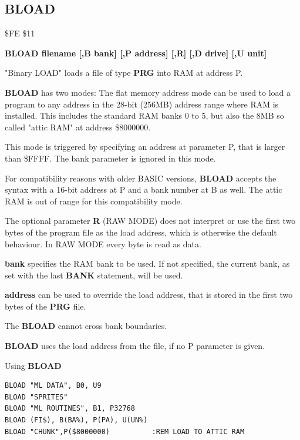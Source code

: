 \subsection{BLOAD}
\begin{description}[leftmargin=2cm,style=nextline]
\item [Token:] \$FE \$11
\item [Format:] {\bf BLOAD filename [,B bank] [,P address] [,R] [,D drive] [,U unit] }
\item [Usage:]
   "Binary LOAD" loads a file of type {\bf PRG} into RAM at address P.

   {\bf BLOAD} has two modes:
   The flat memory address mode can be used to load a program to any
   address in the 28-bit (256MB) address range where RAM is installed.
   This includes the standard RAM banks 0 to 5, but also
   the 8MB so called "attic RAM" at address \$8000000.

   This mode is triggered by specifying an address at parameter P,
   that is larger than \$FFFF. The bank parameter is ignored in this mode.

   For compatibility reasons with older BASIC versions, {\bf BLOAD}
   accepts the syntax with a 16-bit address at P and a bank number at B as well.
   The attic RAM is out of range for this compatibility mode.

   The optional parameter {\bf R} (RAW MODE) does not interpret or use the
   first two bytes of the program file as the load address, which is otherwise the
   default behaviour. In RAW MODE every byte is read as data.

   \filenamedefinition

   {\bf bank} specifies the RAM bank to be used.
   If not specified, the current bank, as set with the last
   {\bf BANK} statement, will be used.

   {\bf address} can be used to override the load address,
   that is stored in the first two bytes of the {\bf PRG} file.

   \drivedefinition

   \unitdefinition

\item [Remarks:]
   The {\bf BLOAD} cannot cross bank boundaries.

{\bf BLOAD} uses the load address from the file, if no P parameter is given.

\item [Examples:] Using {\bf BLOAD}
\begin{tcolorbox}[colback=black,coltext=white]
\verbatimfont{\codefont}
\begin{verbatim}
BLOAD "ML DATA", B0, U9
BLOAD "SPRITES"
BLOAD "ML ROUTINES", B1, P32768
BLOAD (FI$), B(BA%), P(PA), U(UN%)
BLOAD "CHUNK",P($8000000)          :REM LOAD TO ATTIC RAM
\end{verbatim}
\end{tcolorbox}
\end{description}

